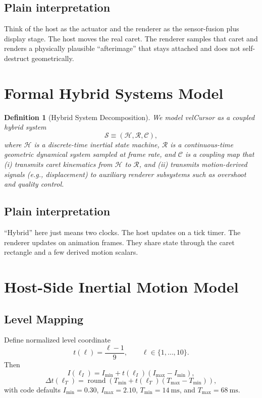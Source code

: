 \documentclass[journal]{IEEEtran}
\newtheorem{definition}{Definition}
\begin{document}
\subsection{Plain interpretation}
Think of the host as the actuator and the renderer as the sensor-fusion plus display stage. The host moves the real caret. The renderer samples that caret and renders a physically plausible ``afterimage'' that stays attached and does not self-destruct geometrically.

\section{Formal Hybrid Systems Model}

\begin{definition}[Hybrid System Decomposition]
We model velCursor as a coupled hybrid system
\[
\mathcal{S} \equiv (\mathcal{H}, \mathcal{R}, \mathcal{C}),
\]
where \(\mathcal{H}\) is a discrete-time inertial state machine, \(\mathcal{R}\) is a continuous-time geometric dynamical system sampled at frame rate, and \(\mathcal{C}\) is a coupling map that (i) transmits caret kinematics from \(\mathcal{H}\) to \(\mathcal{R}\), and (ii) transmits motion-derived signals (e.g., displacement) to auxiliary renderer subsystems such as overshoot and quality control.
\end{definition}

\subsection{Plain interpretation}
``Hybrid'' here just means two clocks. The host updates on a tick timer. The renderer updates on animation frames. They share state through the caret rectangle and a few derived motion scalars.

\section{Host-Side Inertial Motion Model}

\subsection{Level Mapping}
Define normalized level coordinate
\begin{equation}
t(\ell)=\frac{\ell-1}{9}, \qquad \ell \in \{1,\dots,10\}.
\end{equation}
Then
\begin{equation}
I(\ell_I)=I_{\min}+t(\ell_I)\left(I_{\max}-I_{\min}\right),
\end{equation}
\begin{equation}
\Delta t(\ell_T)=\operatorname{round}\left(T_{\min}+t(\ell_T)\left(T_{\max}-T_{\min}\right)\right),
\end{equation}
with code defaults \(I_{\min}=0.30\), \(I_{\max}=2.10\), \(T_{\min}=\SI{14}{\milli\second}\), and \(T_{\max}=\SI{68}{\milli\second}\).
\end{document}
